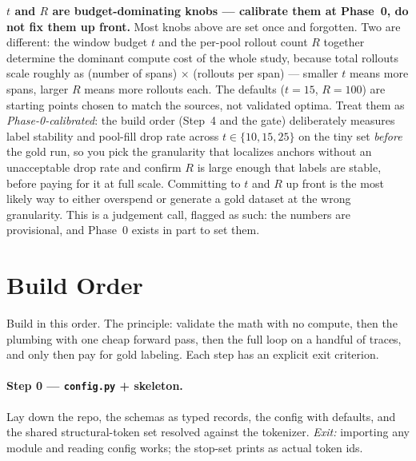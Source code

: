 \documentclass[11pt]{article}
\newcommand{\modu}[1]{\texttt{#1}}
\begin{document}
\begin{notebox}
\textbf{$t$ and $R$ are budget-dominating knobs --- calibrate them at Phase~0, do not fix them up front.} Most knobs above are set once and forgotten. Two are different: the window budget $t$ and the per-pool rollout count $R$ together determine the dominant compute cost of the whole study, because total rollouts scale roughly as (number of spans) $\times$ (rollouts per span) --- smaller $t$ means more spans, larger $R$ means more rollouts each. The defaults ($t=15$, $R=100$) are starting points chosen to match the sources, not validated optima. Treat them as \emph{Phase-0-calibrated}: the build order (Step~4 and the gate) deliberately measures label stability and pool-fill drop rate across $t\in\{10,15,25\}$ on the tiny set \emph{before} the gold run, so you pick the granularity that localizes anchors without an unacceptable drop rate and confirm $R$ is large enough that labels are stable, before paying for it at full scale. Committing to $t$ and $R$ up front is the most likely way to either overspend or generate a gold dataset at the wrong granularity. This is a judgement call, flagged as such: the numbers are provisional, and Phase~0 exists in part to set them.
\end{notebox}

\section{Build Order}
\label{sec:buildorder}

Build in this order. The principle: validate the math with no compute, then the plumbing with one cheap forward pass, then the full loop on a handful of traces, and only then pay for gold labeling. Each step has an explicit exit criterion.

\paragraph{Step 0 --- \modu{config.py} + skeleton.} Lay down the repo, the schemas as typed records, the config with defaults, and the shared structural-token set resolved against the tokenizer. \emph{Exit:} importing any module and reading config works; the stop-set prints as actual token ids.
\end{document}
